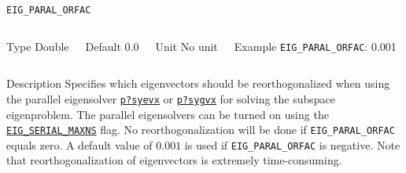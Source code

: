 \begin{frame}[allowframebreaks]{\texttt{EIG\_PARAL\_ORFAC}} \label{EIG_PARAL_ORFAC}
\vspace*{-12pt}
\begin{columns}
\begin{block}{Type}
Double
\end{block}
\begin{block}{Default}
0.0
\end{block}
\begin{block}{Unit}
No unit
\end{block}
\begin{block}{Example}
\texttt{EIG\_PARAL\_ORFAC}: 0.001
\end{block}
\end{columns}
\begin{block}{Description}
Specifies which eigenvectors should be reorthogonalized when using the parallel eigensolver 
\href{https://software.intel.com/content/www/us/en/develop/documentation/onemkl-developer-reference-c/top/scalapack-routines/scalapack-driver-routines/p-syevx.html}{\texttt{p?syevx}} 
or 
\href{https://software.intel.com/content/www/us/en/develop/documentation/onemkl-developer-reference-c/top/scalapack-routines/scalapack-driver-routines/p-sygvx.html}{\texttt{p?sygvx}} 
for solving the subspace eigenproblem. 
The parallel eigensolvers can be turned on using the \hyperlink{EIG_SERIAL_MAXNS}{\texttt{EIG\_SERIAL\_MAXNS}} flag.
No reorthogonalization will be done if \texttt{EIG\_PARAL\_ORFAC} equals zero. A default value of $0.001$ is used if \texttt{EIG\_PARAL\_ORFAC} is negative. 
Note that reorthogonalization of eigenvectors is extremely time-consuming.
\end{block}

\end{frame}


